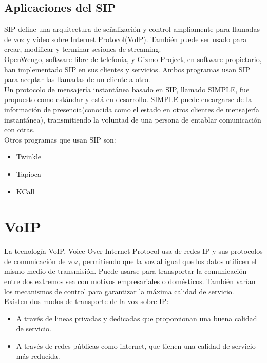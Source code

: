 \documentclass[a4paper, 11pt]{article} %
\begin{document}
	\subsection{Aplicaciones del SIP}
		SIP define una arquitectura de señalización y control ampliamente para llamadas de voz y vídeo sobre Internet Protocol(VoIP). También puede ser usado para crear, modificar y terminar sesiones de streaming.\\
		OpenWengo, software libre de telefonía, y Gizmo Project, en software propietario, han implementado SIP en sus clientes y servicios. Ambos programas usan SIP para aceptar las llamadas de un cliente a otro.\\
		Un protocolo de mensajería instantánea basado en SIP, llamado SIMPLE, fue propuesto como estándar y está en desarrollo. SIMPLE puede encargarse de la información de presencia(conocida como el estado en otros clientes de mensajería instantánea), transmitiendo la voluntad de una persona de entablar comunicación con otras.\\
		Otros programas que usan SIP son:
		\begin{itemize}
			\item Twinkle
			\item Tapioca
			\item KCall
		\end{itemize}

\section{VoIP}
	La tecnología VoIP, Voice Over Internet Protocol usa de redes IP y sus protocolos de comunicación de voz, permitiendo que la voz al igual que los datos utilicen el mismo medio de transmisión. Puede usarse para transportar la comunicación entre dos extremos sea con motivos empresariales o domésticos. También varían los mecanismos de control para garantizar la máxima calidad de servicio.\\
	
	Existen dos modos de transporte de la voz sobre IP:
		\begin{itemize}
		\item A través de lineas privadas y dedicadas que proporcionan una buena calidad de servicio. 
		\item A través de redes públicas como internet, que tienen una calidad de servicio más reducida.
		\end{itemize}
		
\end{document}
